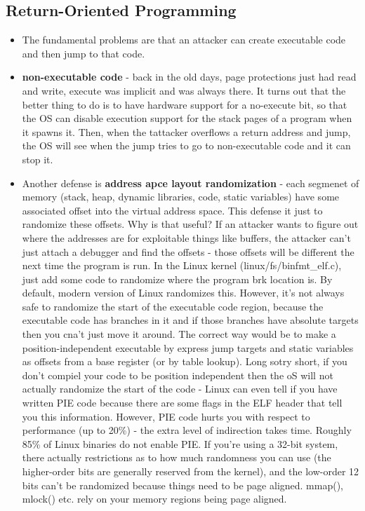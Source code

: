 \documentclass[12pt]{article}
\theoremstyle{definition}
\begin{document}
\subsection{Return-Oriented Programming}
\begin{itemize}
    \itemsep0em 
	\item The fundamental problems are that an attacker can create executable code and then jump to that code.
    \item \textbf{non-executable code} - back in the old days, page protections just had read and write, execute was implicit and was always there. It turns out that the better thing to do is to have hardware support for a no-execute bit, so that the OS can disable execution support for the stack pages of a program when it spawns it. Then, when the tattacker overflows a return address and jump, the OS will see when the jump tries to go to non-executable code and it can stop it.
    \item Another defense is \textbf{address apce layout randomization} - each segmenet of memory (stack, heap, dynamic libraries, code, static variables) have some associated offset into the virtual address space. This defense it just to randomize these offsets. Why is that useful? If an attacker wants to figure out where the addresses are for exploitable things like buffers, the attacker can't just attach a debugger and find the offsets - those offsets will be different the next time the program is run. In the Linux kernel (linux/fs/binfmt\_elf.c), just add some code to randomize where the program brk location is. By default, modern version of Linux randomizes this. However, it's not always safe to randomize the start of the executable code region, because the executable code has branches in it and if those branches have absolute targets then you cna't just move it around. The correct way would be to make a position-independent executable by express jump targets and static variables as offsets from a base register (or by table lookup). Long sotry short, if you don't compiel your code to be position independent then the oS will not actually randomize the start of the code - Linux can even tell if you have written PIE code because there are some flags in the ELF header that  tell you this information. However, PIE code hurts you with respect to performance (up to 20\%) - the extra level of indirection takes time. Roughly 85\% of Linux binaries do not enable PIE. If you're using a 32-bit system, there actually restrictions as to how much randomness you can use (the higher-order bits are generally reserved from the kernel), and the low-order 12 bits can't be randomized because things need to be page aligned. mmap(), mlock() etc. rely on your memory regions being page aligned.

\end{itemize}
\end{document}
